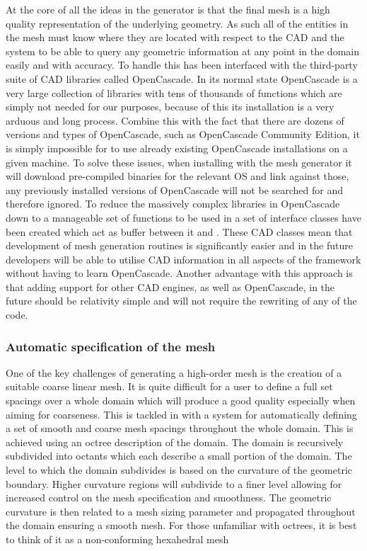 At the core of all the ideas in the \nm generator is that the final mesh is a
high quality representation of the underlying geometry. As such all of the
entities in the mesh must know where they are located with respect to the CAD
and the system to be able to query any geometric information at any point in the
domain easily and with accuracy. To handle this \nm has been interfaced with the
third-party suite of CAD libraries called OpenCascade. In its normal state
OpenCascade is a very large collection of libraries with tens of thousands of
functions which are simply not needed for our purposes, because of this its
installation is a very arduous and long process. Combine this with the fact that
there are dozens of versions and types of OpenCascade, such as OpenCascade
Community Edition, it is simply impossible for \nm to use already existing
OpenCascade installations on a given machine. To solve these issues, when
installing \nekpp with the mesh generator it will download pre-compiled binaries
for the relevant OS and link against those, any previously installed versions of
OpenCascade will not be searched for and therefore ignored.
%
To reduce the massively complex libraries in OpenCascade down to a manageable
set of functions to be used in \nm a set of interface classes have been created
which act as buffer between it and \nekpp. These CAD classes mean that
development of mesh generation routines is significantly easier and in the
future \nekpp developers will be able to utilise CAD information in all aspects
of the framework without having to learn OpenCascade. Another advantage with
this approach is that adding support for other CAD engines, as well as
OpenCascade, in the future should be relativity simple and will not require the
rewriting of any of the \nm code.

\subsubsection{Automatic specification of the mesh}

One of the key challenges of generating a high-order mesh is the creation of a
suitable coarse linear mesh. It is
quite difficult for a user to define a full set spacings over a whole domain
which will produce a good quality especially when aiming for coarseness. This
is tackled in \nm with a system for automatically defining a
set of smooth and coarse mesh spacings throughout the whole domain. This is
achieved using an octree description of the domain. The domain is recursively
subdivided into octants which each describe a small portion of the domain. The
level to which the domain subdivides is based on the curvature of the geometric
boundary. Higher curvature regions will subdivide to a finer level allowing for
increased control on the mesh specification and smoothness. The geometric
curvature is then related to a mesh sizing parameter and propagated throughout
the domain ensuring a smooth mesh. For those unfamiliar with octrees, it is
best to think of it as a non-conforming hexahedral mesh

